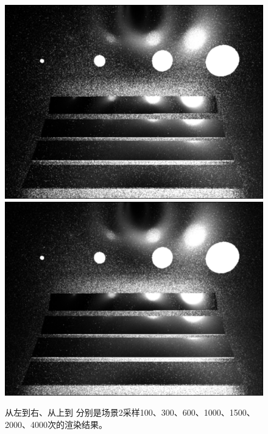 \documentclass[10pt,a4paper]{article}
\begin{document}
\begin{figure}[htbp]
  \includegraphics[width=.38\textwidth]{./figs/scene02_2000.png}
  \includegraphics[width=.38\textwidth]{./figs/scene02_4000.png}
  \caption{从左到右、从上到 分别是场景2采样100、300、600、1000、1500、2000、4000次的渲染结果。}
  \label{fig:scene02}
\end{figure}
\end{document}
